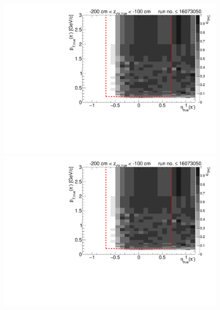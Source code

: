 \begin{figure}[hb]
{  \includegraphics[width=\linewidth,page=16]{graphics/eff/Eff2D_TPC_pion_Minus_RunRange1.pdf}\\
  \includegraphics[width=\linewidth,page=18]{graphics/eff/Eff2D_TPC_pion_Minus_RunRange1.pdf}
}%
\end{figure}

